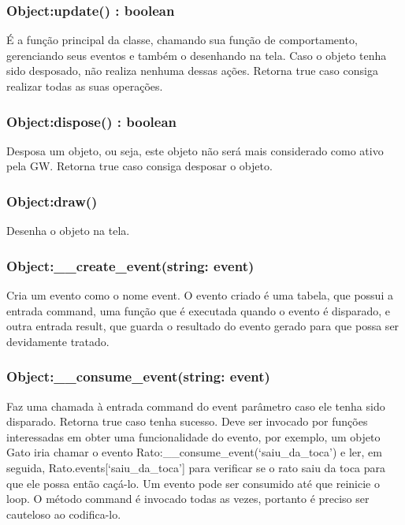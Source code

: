 \documentclass[
	12pt,				%
	openright,			%
	oneside,			%
	a4paper,			%
	brazil,				%
	]{abntex2}
\begin{document}
\subsubsection{Object:update() : boolean}

É a função principal da classe, chamando sua função de comportamento, gerenciando seus eventos e também o desenhando na tela. Caso o objeto tenha sido desposado, não realiza nenhuma dessas ações. Retorna true caso consiga realizar todas as suas operações.

\subsubsection{Object:dispose() : boolean}

Desposa um objeto, ou seja, este objeto não será mais considerado como ativo pela GW. Retorna true caso consiga desposar o objeto.

\subsubsection{Object:draw()}

Desenha o objeto na tela. 

\subsubsection{Object:\_\_create\_event(string: event)}

Cria um evento como o nome event. O evento criado é uma tabela, que possui a entrada command, uma função que é executada quando o evento é disparado, e outra entrada result, que guarda o resultado do evento gerado para que possa ser devidamente tratado. 

\subsubsection{Object:\_\_consume\_event(string: event)}

Faz uma chamada à entrada command do event parâmetro caso ele tenha sido disparado. Retorna true caso tenha sucesso. Deve ser invocado por funções interessadas em obter uma funcionalidade do evento, por exemplo, um objeto Gato iria chamar o evento Rato:\_\_consume\_event(‘saiu\_da\_toca’) e ler, em seguida, Rato.events[‘saiu\_da\_toca’] para verificar se o rato saiu da toca para que ele possa então caçá-lo. Um evento pode ser consumido até que reinicie o loop. O método command é invocado todas as vezes, portanto é preciso ser cauteloso ao codifica-lo.
\end{document}
